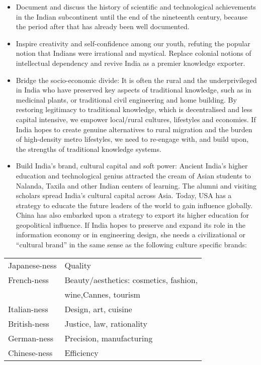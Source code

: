 \begin{itemize}
\itemsep=0pt
\item Document and discuss the history of scientific and technological achievements in the Indian subcontinent until the end of the nineteenth century, because the period after that has already been well documented.

\item Inspire creativity and self-confidence among our youth, refuting the popular notion that Indians were irrational and mystical. Replace colonial notions of intellectual dependency and revive India as a premier knowledge exporter. 

\item Bridge the socio-economic divide: It is often the rural and the underprivileged in India who have preserved key aspects of traditional knowledge, such as in medicinal plants, or traditional civil engineering and home building. By restoring legitimacy to traditional knowledge, which is decentralised and less capital intensive, we empower local/rural cultures, lifestyles and economies. If India hopes to create genuine alternatives to rural migration and the burden of high-density metro lifestyles, we need to re-engage with, and build upon, the strengths of traditional knowledge systems. 

\item Build India’s brand, cultural capital and soft power: Ancient India’s higher education and technological genius attracted the cream of Asian students to Nalanda, Taxila and other Indian centers of learning. The alumni and visiting scholars spread India’s cultural capital across Asia. Today, USA has a strategy to educate the future leaders of the world to gain influence globally. China has also embarked upon a strategy to export its higher education for geopolitical influence. If India hopes to preserve and expand its role in the information economy or in engineering design, she needs a civilizational or “cultural brand” in the same sense as the following culture specific brands:
\end{itemize}

\begin{tabular}{ll}
 Japanese-ness  &  Quality\\
 French-ness  &  Beauty/aesthetics: cosmetics, fashion,\\
              &   wine,Cannes, tourism\\ 
 Italian-ness  & Design, art, cuisine\\
 British-ness & Justice, law, rationality\\
 German-ness & Precision, manufacturing\\
 Chinese-ness  & Efficiency
\end{tabular}

